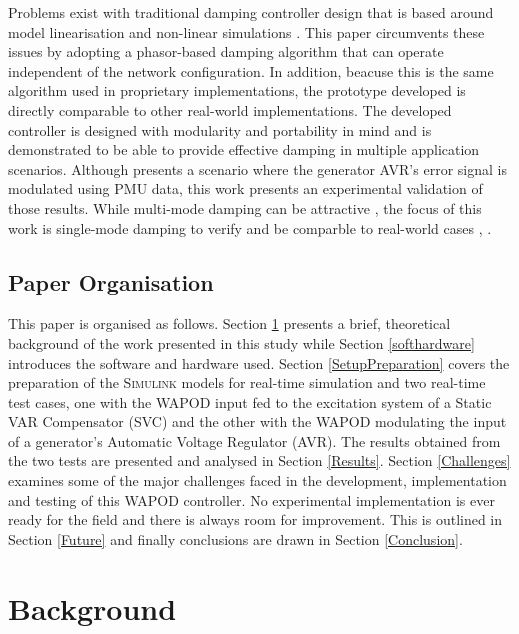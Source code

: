 \documentclass{ieeeaccess}
\begin{document}
Problems exist with traditional damping controller design that is based around model linearisation and non-linear simulations \cite{WAPODChina}. This paper circumvents these issues by adopting a phasor-based damping algorithm \cite{PhasorPOD} that can operate independent of the network configuration. In addition, beacuse this is the same algorithm used in proprietary implementations\cite{WAPODNorway}, the prototype developed is directly comparable to other real-world implementations. The developed controller is designed with modularity and portability in mind and is demonstrated to be able to provide effective damping in multiple application scenarios. Although \cite{Yuwa} presents a scenario where the generator AVR\rq{s} error signal is modulated using PMU data, this work presents an experimental validation of those results. While multi-mode damping can be attractive \cite{Kamwa}, the focus of this work is  single-mode damping to verify and be comparble to real-world cases \cite{WAPODNorway}, \cite{WAPODChina} .

\subsection{Paper Organisation}

This paper is organised as follows. Section \ref{Background} presents a brief, theoretical background of the work presented in this study while Section \ref{softhardware} introduces the software and hardware used. Section \ref{SetupPreparation} covers the preparation of the \textsc{Simulink} models for real-time simulation and two real-time test cases, one with the WAPOD input fed to the excitation system of a Static VAR Compensator (SVC) and the other with the WAPOD modulating the input of a generator\rq{s} Automatic Voltage Regulator (AVR). The results obtained from the two tests are presented and analysed in Section \ref{Results}. Section \ref{Challenges} examines some of the major challenges faced in the development, implementation and testing of this WAPOD controller. No experimental implementation is ever ready for the field and there is always room for improvement. This is outlined in Section \ref{Future} and finally conclusions are drawn in Section \ref{Conclusion}.

\section{Background}\label{Background}
\end{document}
